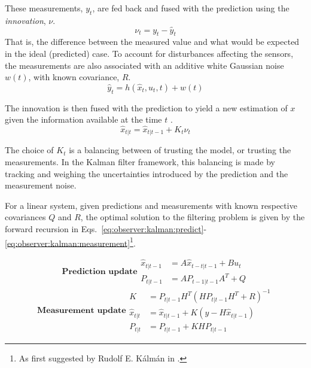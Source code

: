     These measurements, $y_{t}$, are fed back and fused with the
    prediction using the \textit{innovation}, $\nu$.
    \begin{equation}
        \nu_{t} = y_{t} - \hat{y}_{t}
    \end{equation}
    That is, the difference between the measured value and what would be
    expected in the ideal (predicted) case.
    To account for disturbances affecting the sensors, the measurements
    are also associated with an additive white Gaussian noise $w(t)$, with
    known covariance, $R$.
    \begin{equation}
        \hat{y}_{t} = h(\hat{x}_{t}, u_{t}, t) + w(t)
    \end{equation}

    The innovation is then fused with the prediction to yield a new
    estimation of $x$ given the
    information available at the time $t$ \citep{gustafsson2010statistical}.
    \begin{equation}
        \hat{x}_{t|t} = \hat{x}_{t|t-1} + K_{t}\nu_{t}
    \end{equation}

    The choice of $K_{t}$ is a balancing between of trusting the model,
    or trusting the measurements. In the Kalman filter framework,
    this balancing is made by tracking and weighing the uncertainties
    introduced by the prediction and the measurement noise.

    \begin{algorithm}
        \label{alg:kf}
        For a linear system, given predictions and measurements with known respective
        covariances $Q$ and $R$, the optimal solution to the filtering
        problem is given by the forward
        recursion in Eqs.~\eqref{eq:observer:kalman:predict}-\eqref{eq:observer:kalman:measurement}\footnote{As first suggested by Rudolf E. Kálmán in \cite{kalman1960}.}.

        \begin{subequations}
            \label{eq:observer:kalman:predict}
            \textbf{Prediction update}
            \begin{align}
                \hat{x}_{t|t-1} &= A \hat{x}_{t-t|t-1} + B u_{t} \\
                P_{t|t-1} &= A P_{t-1|t-1} A^{T} + Q
            \end{align}
        \end{subequations}
        \begin{subequations}
            \label{eq:observer:kalman:measurement}
            \textbf{Measurement update}
            \begin{align}
                K &= P_{t|t-1} H^{T} \left( H P_{t|t-1} H^{T} + R \right)^{-1}  \label{eq:observer:filtering:kalmanK} \\
                \hat{x}_{t|t} &= \hat{x}_{t|t-1} + K \left( y - H \hat{x}_{t|t-1} \right) \\
                P_{t|t} &= P_{t|t-1} + K H P_{t|t-1}
            \end{align}
        \end{subequations}
    \end{algorithm}

